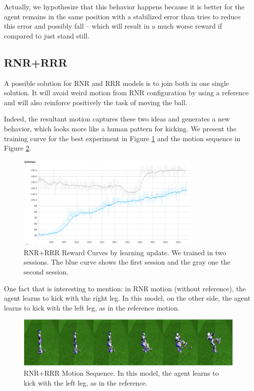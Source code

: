 Actually, we hypothesize that this behavior happens because it is better for the agent remains in the same position with a stabilized error than tries to reduce this error and possibly fall -- which will result in a much worse reward if compared to just stand still.

\subsection{RNR+RRR}

A possible solution for RNR and RRR models is to join both in one single solution. It will avoid weird motion from RNR configuration by using a reference and will also reinforce positively the task of moving the ball.

Indeed, the resultant motion captures these two ideas and generates a new behavior, which looks more like a human pattern for kicking. We present the training curve for the best experiment in Figure \ref{fig:rnrrrrrewardcurve} and the motion sequence in Figure \ref{fig:rnrrrrreward}.

\begin{figure}[!htbp]
	\centering
	\includegraphics[width=0.8\textwidth]{Cap6/rnrrrrrewardcurve.eps}
	\caption{RNR+RRR Reward Curves by learning update. We trained in two sessions. The blue curve shows the first session and the gray one the second session.}
	\label{fig:rnrrrrrewardcurve}
\end{figure}

One fact that is interesting to mention: in RNR motion (without reference), the agent learns to kick with the right leg. In this model, on the other side, the agent learns to kick with the left leg, as in the reference motion.

\begin{figure}[!htbp]
	\centering
	\includegraphics[width=1.0\textwidth]{Cap6/rnrrrrreward.eps}
	\caption{RNR+RRR Motion Sequence. In this model, the agent learns to kick with the left leg, as in the reference.}
	\label{fig:rnrrrrreward}
\end{figure}


